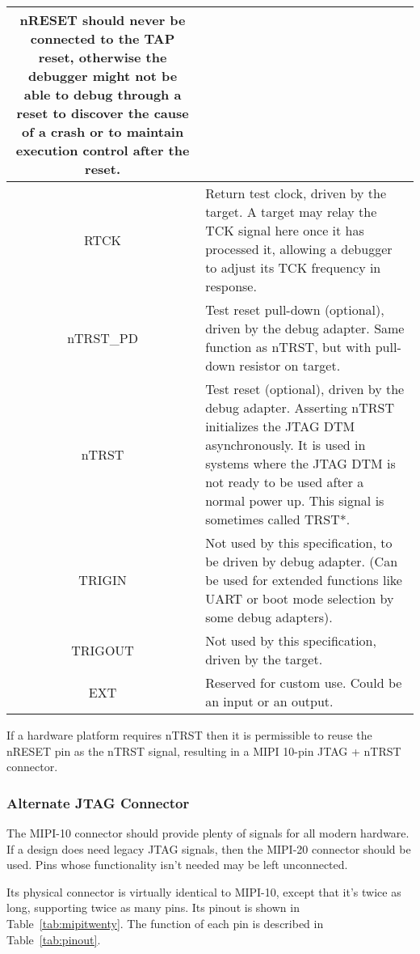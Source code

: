 \begin{table}[htp]
\begin{tabulary}{\textwidth}{|c|L|}
        nRESET should never be connected to the TAP reset, otherwise the
        debugger might not be able to debug through a reset to discover the
        cause of a crash or to maintain execution control after the reset. \\
      \hline
      RTCK & Return test clock, driven by the target. A target may relay
        the TCK signal here once it has processed it, allowing a debugger to
        adjust its TCK frequency in response. \\
      \hline
      nTRST\_PD & Test reset pull-down (optional), driven by the debug
        adapter. Same function as nTRST, but with pull-down resistor on target.
        \\
      \hline
      nTRST & Test reset (optional), driven by the debug adapter. Asserting
        nTRST initializes the JTAG DTM asynchronously. It is used in systems
        where the JTAG DTM is not ready to be used after a normal power up. This
        signal is sometimes called TRST*. \\
      \hline
      TRIGIN & Not used by this specification, to be driven by debug
        adapter.  (Can be used for extended functions like UART or boot mode
        selection by some debug adapters). \\
      \hline
      TRIGOUT & Not used by this specification, driven by the target. \\
      \hline
      EXT & Reserved for custom use. Could be an input or an output. \\
      \hline
    \end{tabulary}
\end{table}

If a hardware platform requires nTRST then it is permissible to reuse the nRESET pin as
the nTRST signal, resulting in a MIPI 10-pin JTAG + nTRST connector.

\subsubsection{Alternate JTAG Connector}

The MIPI-10 connector should provide plenty of signals for all modern hardware.
If a design does need legacy JTAG signals, then the
MIPI-20 connector should be used. Pins whose functionality isn't needed may be
left unconnected.

Its physical connector is virtually identical
to MIPI-10, except that it's twice as long, supporting twice as many pins. Its
pinout is shown in Table~\ref{tab:mipitwenty}. The function of each pin
is described in Table~\ref{tab:pinout}.

